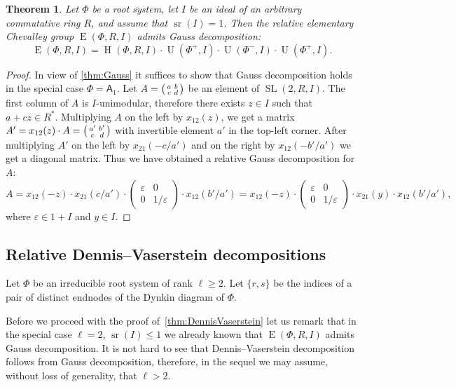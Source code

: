 \documentclass[11pt]{amsart}
\theoremstyle{plain}
\newtheorem{thm}{Theorem}
\numberwithin{equation}{section}
\numberwithin{lemma}{section}
\theoremstyle{definition}
\theoremstyle{remark}
\DeclareMathOperator{\SL}{SL}
\DeclareMathOperator{\E}{E}
\DeclareMathOperator{\Hh}{H}
\DeclareMathOperator{\U}{U}
\DeclareMathOperator{\sr}{sr}
\newcommand{\rA}{\mathsf{A}}
\begin{document}
\begin{thm}\label{thm:srRI1}
Let $\Phi$ be a root system, let $I$ be an ideal of an arbitrary commutative ring $R$, and assume that $\sr(I)=1$.
Then the relative elementary Chevalley group $\E(\Phi, R, I)$ admits Gauss decomposition:
\[ \E(\Phi, R, I) = \Hh(\Phi, R, I) \cdot \U(\Phi^+, I) \cdot \U(\Phi^-, I) \cdot \U(\Phi^+, I). \]
\end{thm}
\begin{proof}
In view of \cref{thm:Gauss} it suffices to show that Gauss decomposition holds in the special case $\Phi=\rA_1$.
Let $A=\begin{psmallmatrix}a & b \\ c & d\end{psmallmatrix}$ be an element of $\SL(2, R, I)$.
The first column of $A$ is $I$-unimodular, therefore there exists $z\in I$ such that $a+cz\in R^*$.
Multiplying $A$ on the left by $x_{12}(z)$, we get a matrix $A'=x_{12}(z)\cdot A=\begin{psmallmatrix}a' & b' \\ c & d\end{psmallmatrix}$ with invertible element $a'$ in the top-left corner.
After multiplying $A'$ on the left by $x_{21}(-c/a')$ and on the right by $x_{12}(-b'/a')$ we get a diagonal matrix. 
Thus we have obtained a relative Gauss decomposition for $A$:
\begin{equation*}
A=x_{12}(-z)\cdot x_{21}(c/a')\cdot
\begin{pmatrix} \varepsilon & 0 \\ 0 & 1/\varepsilon \end{pmatrix}
\cdot x_{12}(b'/a')=x_{12}(-z)\cdot
\begin{pmatrix} \varepsilon & 0 \\ 0 & 1/\varepsilon \end{pmatrix}
\cdot x_{21}(y) \cdot x_{12}(b'/a'), 
\end{equation*}
where $\varepsilon\in 1+I$ and $y\in I$. \end{proof}

\subsection{Relative Dennis--Vaserstein decompositions}\label{sec:dennis-vaserstein}
Let $\Phi$ be an irreducible root system of rank $\ell\geq 2$.
Let $\{r, s\}$ be the indices of a pair of distinct endnodes of the Dynkin diagram of $\Phi$.

Before we proceed with the proof of~\cref{thm:DennisVaserstein} let us remark that in the special case $\ell=2$, $\sr(I)\leq 1$
 we already known that $\E(\Phi, R, I)$ admits Gauss decomposition.
It is not hard to see that Dennis--Vaserstein decomposition follows from Gauss decomposition, 
 therefore, in the sequel we may assume, without loss of generality, that $\ell > 2$.
\end{document}
